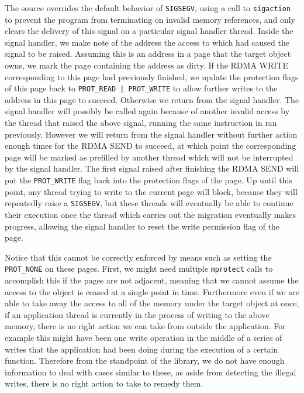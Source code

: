The source overrides the default behavior of \texttt{SIGSEGV}, using a call to
\texttt{sigaction} to prevent the program from terminating on invalid memory
references, and only clears the delivery of this signal on a particular
signal handler thread.
Inside the signal handler, we make note of the address the access
to which had caused the signal to be raised. Assuming this is an address in a
page that the target object owns, we mark the page containing the address as
dirty. If the RDMA WRITE corresponding to this page had previously finished, we
update the protection flags of this page back to \texttt{PROT\_READ | PROT\_WRITE}
to allow further writes to the address in this page to succeed. Otherwise we
return from the signal handler. The signal handler will possibly be called
again because of another invalid access by the thread that raised the above
signal, running the same instruction in ran previously. However we will return
from the signal handler without further action enough times for the RDMA SEND
to succeed, at which point the corresponding page will be marked as prefilled
by another thread which will not be interrupted by the signal handler. The first
signal raised after finishing the RDMA SEND will put the \texttt{PROT\_WRITE}
flag back into the protection flags of the page. Up until this point, any thread
trying to write to the current page will block, because they will repeatedly raise
a \texttt{SIGSEGV}, but these threads will eventually be able to continue their
execution once the thread which carries out the migration eventually makes
progress, allowing the signal handler to reset the write permission flag of the
page.


Notice that this cannot be correctly enforced by means such as setting the
\texttt{PROT\_NONE} on these pages. First, we might need multiple
\texttt{mprotect} calls to accomplish this if the pages are not adjacent,
meaning that we cannot assume the access to the object is ceased at a single
point in time. Furthermore even if we are able to take away the access to all
of the memory under the target object at once, if an application thread is
currently in the process of writing to the above memory, there is no right
action we can take from outside the application. For example this might have
been one write operation in the middle of a series of writes that the
application had been doing during the execution of a certain function. Therefore
from the standpoint of the library, we do not have enough information to deal
with cases similar to these, as aside from detecting the illegal writes, there
is no right action to take to remedy them.

